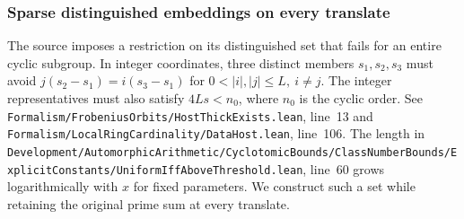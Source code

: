 \documentclass[a4paper,11pt]{article}
\theoremstyle{definition}
\theoremstyle{remark}
\newcommand{\srcloc}[2]{{\small\nolinkurl{#1.lean}}, line~#2}
\numberwithin{equation}{section}
\begin{document}
\subsubsection{Sparse distinguished embeddings on every translate}\label{nav:I-30}
The source imposes a restriction on its distinguished set that fails
for an entire cyclic subgroup. In integer coordinates, three distinct
members \(s_1,s_2,s_3\) must avoid
\(j(s_2-s_1)=i(s_3-s_1)\) for \(0<|i|,|j|\le L,\ i\ne j\).
The integer representatives must also satisfy \(4Ls<n_0\), where
\(n_0\) is the cyclic order. See
\srcloc{Formalism/FrobeniusOrbits/HostThickExists}{13} and
\srcloc{Formalism/LocalRingCardinality/DataHost}{106}.
The length in
\srcloc{Development/AutomorphicArithmetic/CyclotomicBounds/ClassNumberBounds/ExplicitConstants/UniformIffAboveThreshold}{60}
grows logarithmically with \(x\) for fixed parameters. We construct
such a set while retaining the original prime sum at every translate.
\end{document}
